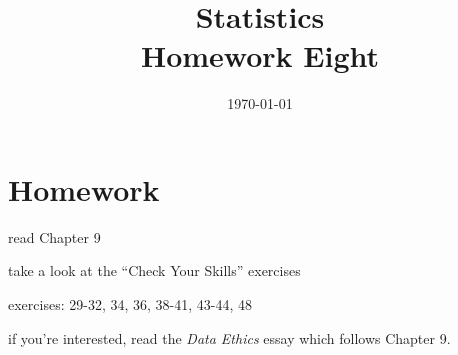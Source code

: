\documentclass[letterpaper]{exam}
\title{Statistics \\ Homework Eight}
\date{\today}
\author{}
\begin{document}
  \maketitle

  \section{Homework}
    \begin{itemize*}
      \item read Chapter 9 
      \item take a look at the ``Check Your Skills'' exercises
      \item exercises: 29-32, 34, 36, 38-41, 43-44, 48
      \item if you're interested, read the {\em Data Ethics} essay which follows
        Chapter 9.
    \end{itemize*}
\end{document}
